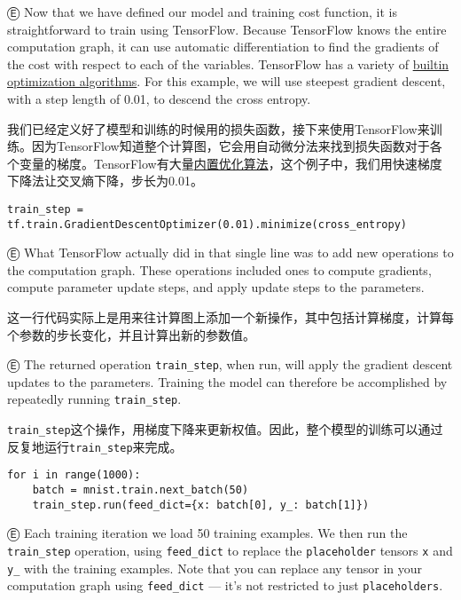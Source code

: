 Ⓔ \textcolor{etc}{Now that we have defined our model and training cost function, it is straightforward to train using TensorFlow. Because TensorFlow knows the entire computation graph, it can use automatic differentiation to find the gradients of the cost with respect to each of the variables. TensorFlow has a variety of \hyperref[optimizers]{builtin optimization algorithms}. For this example, we will use steepest gradient descent, with a step length of 0.01, to descend the cross entropy.}

我们已经定义好了模型和训练的时候用的损失函数，接下来使用TensorFlow来训练。因为TensorFlow知道整个计算图，它会用自动微分法来找到损失函数对于各个变量的梯度。TensorFlow有大量\hyperref[optimizers]{内置优化算法}，这个例子中，我们用快速梯度下降法让交叉熵下降，步长为0.01。

\begin{lstlisting}
train_step = tf.train.GradientDescentOptimizer(0.01).minimize(cross_entropy)
\end{lstlisting}

Ⓔ \textcolor{etc}{What TensorFlow actually did in that single line was to add new operations to the computation graph. These operations included ones to compute gradients, compute parameter update steps, and apply update steps to the parameters.}

这一行代码实际上是用来往计算图上添加一个新操作，其中包括计算梯度，计算每个参数的步长变化，并且计算出新的参数值。

Ⓔ \textcolor{etc}{The returned operation \lstinline{train_step}, when run, will apply the gradient descent updates to the parameters. Training the model can therefore be accomplished by repeatedly running \lstinline{train_step}.}

\lstinline{train_step}这个操作，用梯度下降来更新权值。因此，整个模型的训练可以通过反复地运行\lstinline{train_step}来完成。

\begin{lstlisting}
for i in range(1000):
    batch = mnist.train.next_batch(50)
    train_step.run(feed_dict={x: batch[0], y_: batch[1]})
\end{lstlisting}

Ⓔ \textcolor{etc}{Each training iteration we load 50 training examples. We then run the \lstinline{train_step} operation, using \lstinline{feed_dict} to replace the \lstinline{placeholder} tensors \lstinline{x} and \lstinline{y_} with the training examples. Note that you can replace any tensor in your computation graph using \lstinline{feed_dict} --- it's not restricted to just \lstinline{placeholders}.}

